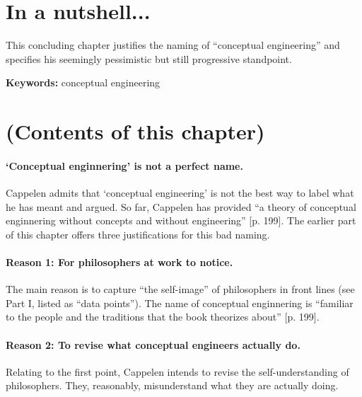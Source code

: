 \documentclass[
10pt, %
a4paper, %
twocolumn, %
landscape %
]{article}
\begin{document}
\pagestyle{myheadings} %
\markright{\doctitle} %


\thispagestyle{plain} %

\printtitle %


\section*{In a nutshell... }
This concluding chapter justifies the naming of ``conceptual engineering'' and specifies his seemingly pessimistic but still progressive standpoint.

\noindent \textbf{Keywords:} conceptual engineering

\section*{(Contents of this chapter)}
\paragraph{`Conceptual enginnering' is not a perfect name.}
Cappelen admits that `conceptual engineering' is not the best way to label what he has meant and argued. So far, Cappelen has provided ``a theory of conceptual enginnering without concepts and without engineering''
[p. 199].
The earlier part of this chapter offers three justifications for this bad naming.

\paragraph{Reason 1: For philosophers at work to notice. }
The main reason is to capture ``the self-image'' of philosophers in front lines (see Part I, listed as ``data points'').
The name of conceptual enginnering is ``familiar to the people and the traditions that the book theorizes about'' [p. 199].

\paragraph{Reason 2: To revise what conceptual engineers actually do. }
Relating to the first point,
Cappelen intends to revise the self-understanding of philosophers.
They, reasonably, misunderstand what they are actually doing.
\end{document}
